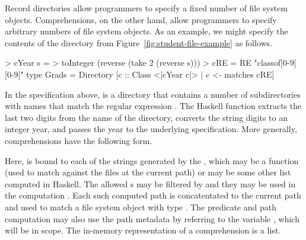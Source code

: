 \documentclass[natbib]{sigplanconf}
\begin{document}
Record directories allow programmers to specify a fixed number of file system objects.
Comprehensions, on the other hand, allow programmers to specify arbitrary numbers
of file system objects.  As an example, we might specify the contents of the
 directory from Figure~\ref{fig:student-file-example} as follows.
\begin{code}
> cYear s = 
>   toInteger (reverse (take 2 (reverse s)))
> cRE = RE "classof[0-9][0-9]"
\mbox{}
type Grads = Directory 
  [c :: Class <|cYear c|> | c <- matches cRE]
\end{code}
In the specification above,  is a directory that contains a number of
 subdirectories with names  that match the regular expression
.  The Haskell function  extracts the last two digits from the
name of the directory, converts the string digits to an integer year, and passes
the year to the underlying  specification.
More generally, comprehensions have the following form.
\begin{code}
\end{code}
Here,  is bound to each of the strings generated by the ,
which may be a  function (used to match against the files
at the current path) or may be some other list computed in Haskell. The allowed
s may be filtered by  and they may be used in the computation
.  Each such computed path is concatentated to the current path and
used to match a file system object with type .  The predicate and path
computation may also use the path metadata by referring to the variable
, which will be in scope.  The in-memory representation of a comprehension
is a list.
\end{document}
